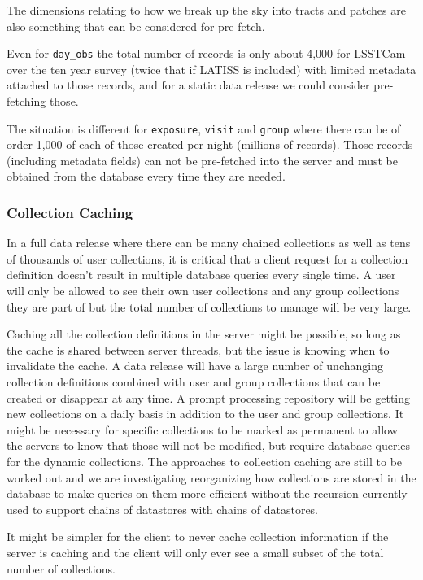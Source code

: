 The dimensions relating to how we break up the sky into tracts and patches are also something that can be considered for pre-fetch.

Even for \texttt{day\_obs} the total number of records is only about 4,000 for LSSTCam over the ten year survey (twice that if LATISS is included) with limited metadata attached to those records, and for a static data release we could consider pre-fetching those.

The situation is different for \texttt{exposure}, \texttt{visit} and \texttt{group} where there can be of order 1,000 of each of those created per night (millions of records).
Those records (including metadata fields) can not be pre-fetched into the server and must be obtained from the database every time they are needed.

\subsubsection{Collection Caching}\label{collection-caching}

In a full data release where there can be many chained collections as well as tens of thousands of user collections, it is critical that a client request for a collection definition doesn't result in multiple database queries every single time.
A user will only be allowed to see their own user collections and any group collections they are part of but the total number of collections to manage will be very large.

Caching all the collection definitions in the server might be possible, so long as the cache is shared between server threads, but the issue is knowing when to invalidate the cache.
A data release will have a large number of unchanging collection definitions combined with user and group collections that can be created or disappear at any time.
A prompt processing repository will be getting new collections on a daily basis in addition to the user and group collections.
It might be necessary for specific collections to be marked as permanent to allow the servers to know that those will not be modified, but require database queries for the dynamic collections.
The approaches to collection caching are still to be worked out and we are investigating reorganizing how collections
are stored in the database to make queries on them more efficient without the recursion currently used to support chains of datastores with chains of datastores.

It might be simpler for the client to never cache collection information if the server is caching and the client will only ever see a small subset of the total number of collections.

